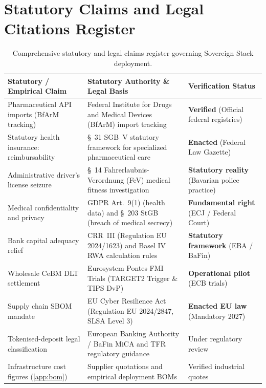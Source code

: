 \documentclass[a4paper,11pt,twoside,parskip=half-,headings=small]{scrartcl}
\begin{document}
\clearpage
\printbibliography[heading=bibintoc,title={References}]

\appendix

\section{Statutory Claims and Legal Citations Register}
\label{app:claims}

\begin{table}[H]
\centering\small
\renewcommand{\arraystretch}{1.2}
\begin{tabularx}{\linewidth}{@{}L{3.8cm} Y L{3.2cm}@{}}
\toprule
\textbf{Statutory / Empirical Claim} & \textbf{Statutory Authority \& Legal Basis} & \textbf{Verification Status}\\
\midrule
Pharmaceutical API imports (BfArM tracking) & Federal Institute for Drugs and Medical Devices (BfArM) import tracking~\cite{bfarm2025import} & \textbf{Verified} (Official federal registries)\\
Statutory health insurance: reimbursability & \S~31 SGB~V statutory framework for specialized pharmaceutical care & \textbf{Enacted} (Federal Law Gazette)\\
Administrative driver's license seizure & \S~14 Fahrerlaubnis-Verordnung (FeV) medical fitness investigation & \textbf{Statutory reality} (Bavarian police practice)\\
Medical confidentiality and privacy & GDPR Art.~9(1) (health data) and \S~203 StGB (breach of medical secrecy) & \textbf{Fundamental right} (ECJ / Federal Court)\\
Bank capital adequacy relief & CRR~III (Regulation EU 2024/1623) and Basel IV RWA calculation rules & \textbf{Statutory framework} (EBA / BaFin)\\
Wholesale CeBM DLT settlement & Eurosystem Pontes FMI Trials (TARGET2 Trigger \& TIPS DvP) & \textbf{Operational pilot} (ECB trials)\\
Supply chain SBOM mandate & EU Cyber Resilience Act (Regulation EU 2024/2847, SLSA Level 3) & \textbf{Enacted EU law} (Mandatory 2027)\\
Tokenised-deposit legal classification & European Banking Authority / BaFin MiCA and TFR regulatory guidance & Under regulatory review\\
Infrastructure cost figures (\cref{app:bom}) & Supplier quotations and empirical deployment BOMs & Verified industrial quotes\\
\bottomrule
\end{tabularx}
\caption{Comprehensive statutory and legal claims register governing Sovereign Stack deployment.}
\end{table}
\end{document}
